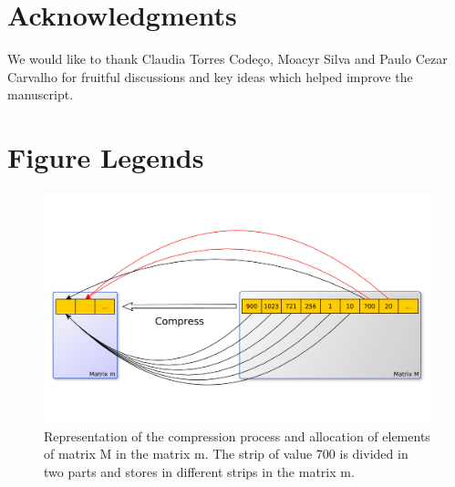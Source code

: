 \documentclass[10pt]{article}
\begin{document}


\section*{Acknowledgments}
We would like to thank Claudia Torres Code\c{c}o, Moacyr Silva and Paulo
Cezar Carvalho for fruitful discussions and key ideas which helped improve the
manuscript.



\section*{Figure Legends}

\begin{figure}[h]
  \includegraphics[scale=0.3,clip]{fig01}
  \caption{Representation of the compression process and allocation of 
elements of matrix M in the matrix m. The strip of value 700 is divided in two 
parts and stores in different strips in the matrix m.}
  \label{fig:01}
\end{figure}
\end{document}
